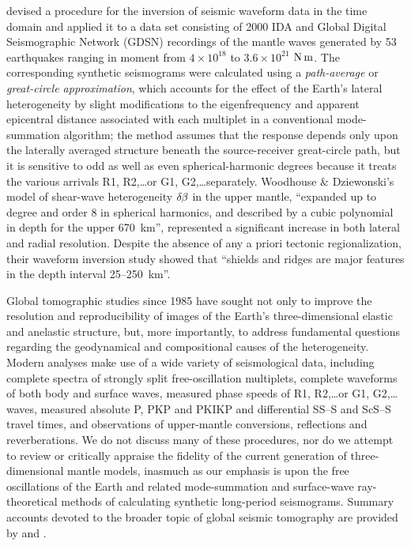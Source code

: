 %
\textcite{woodhouse&dziewonski84} devised a procedure for the
inversion of seismic waveform data in the time domain and applied
it to a data set consisting of 2000 IDA and Global Digital Seismographic
Network (GDSN) recordings of the mantle waves generated by
53 earthquakes ranging in moment from $4\times 10^{18}$ to
$3.6\times 10^{21}$ ${\rm N}\,{\rm m}$.
The corresponding synthetic seismograms were calculated
using a {\em path-average\/} or {\em great-circle approximation\/}, which accounts
%
for the effect of the Earth's lateral heterogeneity by slight
modifications to the eigenfrequency and apparent epicentral
distance associated with each multiplet in a conventional
mode-summation algorithm; the method assumes that the response
depends only upon the laterally averaged structure beneath the
source-receiver great-circle path, but it is sensitive to odd
as well as even spherical-harmonic degrees because it treats
the various arrivals R1, R2,\hspace{0.2mm}\ldots or G1, G2,\hspace{0.2mm}\ldots separately.
Woodhouse \& Dziewonski's model of shear-wave heterogeneity
$\delta\hspace{-0.2 mm}\beta$ in the upper mantle, ``expanded up
to degree and order 8 in spherical harmonics, and described by
a cubic polynomial in depth for the upper 670~km'', represented
a significant increase in both
lateral and radial resolution.  Despite the absence
of any a priori tectonic regionalization, their waveform inversion
study showed that ``shields and ridges are major features in the
depth interval 25--250~km''.  
%

Global tomographic studies since 1985 have sought not only to improve the
resolution and reproducibility of images of the Earth's three-dimensional
elastic and anelastic structure, but, more importantly, to address
fundamental questions regarding the geodynamical and compositional
causes of the heterogeneity.  Modern analyses make use of a wide
variety of seismological data, including complete spectra of strongly
split free-oscillation multiplets, complete waveforms of both body
and surface waves, measured phase speeds of R1, R2,\hspace{0.2mm}\ldots or
G1, G2,\hspace{0.2mm}\ldots waves, measured absolute P, PKP and PKIKP
and differential SS--S and ScS--S travel times, and observations
of upper-mantle conversions, reflections and reverberations.
We do not discuss many of these procedures, nor do we attempt
to review or critically appraise the fidelity of the current
generation of three-dimensional mantle models, inasmuch as our
emphasis is upon the free oscillations of the Earth and related
mode-summation and surface-wave ray-theoretical methods of
calculating synthetic long-period seismograms.
Summary accounts devoted to the broader topic of global seismic
tomography are provided by \textcite{romanowicz91} and
\textcite{ritzwoller&lavely95}.
%
